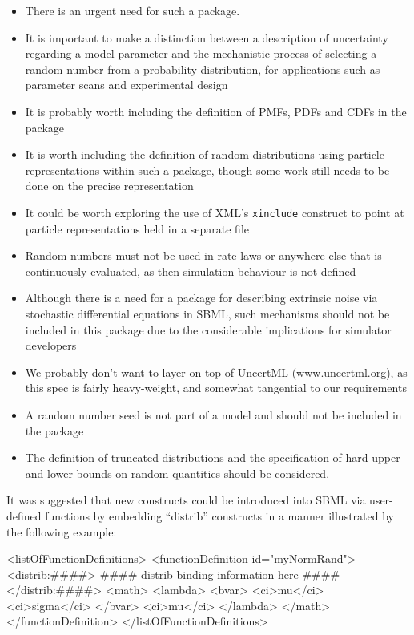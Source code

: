 \documentclass[draftspec]{sbmlpkgspec}
\newcommand{\uncertml}{UncertML\xspace}
\begin{document}
\begin{itemize}
\item There is an urgent need for such a package.
\item It is important to make a distinction between a description of
  uncertainty regarding a model parameter and the mechanistic process
  of selecting a random number from a probability distribution, for
  applications such as parameter scans and experimental design
\item It is probably worth including the definition of PMFs, PDFs and CDFs in the package
\item It is worth including the definition of random distributions using particle representations within such a package, though some work
 still needs to be done on the precise representation
\item It could be worth exploring the use of XML's \texttt{xinclude} construct to point at particle
representations held in a separate file
\item Random numbers must not be used in rate laws or anywhere else that
 is continuously evaluated, as then simulation behaviour is not
 defined
\item Although there is a need for a package for describing extrinsic
 noise via stochastic differential equations in SBML, such mechanisms
 should not be included in this package due to the considerable
 implications for simulator developers
\item We probably don't want to layer on top of \uncertml
 (\url{www.uncertml.org}), as this spec is fairly heavy-weight, and
 somewhat tangential to our requirements
\item A random number seed is not part of a model and should not be
 included in the package
\item The definition of truncated distributions and the specification of
 hard upper and lower bounds on random quantities should be
 considered.
\end{itemize}

It was suggested that new constructs could be introduced into SBML via user-defined functions by embedding ``distrib'' constructs in a manner illustrated by the following example:

\begin{example}
<listOfFunctionDefinitions>
  <functionDefinition id="myNormRand">
    <distrib:####>
      #### distrib binding information here ####
    </distrib:####>
    <math>
      <lambda>
        <bvar>
          <ci>mu</ci>
          <ci>sigma</ci>
        </bvar>
        <ci>mu</ci>
      </lambda>
    </math>
  </functionDefinition>
</listOfFunctionDefinitions>
\end{example}
\end{document}

